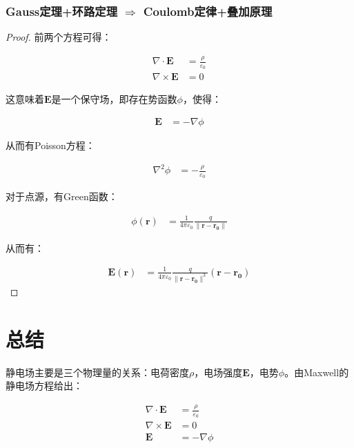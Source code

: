 \documentclass[12pt,onecolumn,a4paper]{book}
\numberwithin{table}{subsection}
\numberwithin{equation}{subsection}
\begin{document}
\subsubsection{Gauss定理+环路定理 $\Rightarrow$ Coulomb定律+叠加原理}

\begin{proof}
    前两个方程可得：

    \begin{align}
        \nabla \cdot \mathbf{E}  & = \frac{\rho}{\varepsilon_0} \\
        \nabla \times \mathbf{E} & = 0
    \end{align}

    这意味着$\mathbf{E}$是一个保守场，即存在势函数$\phi$，使得：

    \begin{align}
        \mathbf{E} & = - \nabla \phi
    \end{align}

    从而有Poisson方程：

    \begin{align}
        \nabla^2 \phi & = - \frac{\rho}{\varepsilon_0}
    \end{align}

    对于点源，有Green函数：

    \begin{align}
        \phi(\mathbf{r}) & = \frac{1}{4 \pi \varepsilon_0} \frac{q}{\|\mathbf{r}-\mathbf{r_0}\|}
    \end{align}

    从而有：

    \begin{align}
        \mathbf{E}(\mathbf{r}) & = \frac{1}{4 \pi \varepsilon_0} \frac{q}{\|\mathbf{r}-\mathbf{r_0}\|^3} (\mathbf{r}-\mathbf{r_0})
    \end{align}

\end{proof}

\section{总结}

静电场主要是三个物理量的关系：电荷密度$\rho$，电场强度$\mathbf{E}$，电势$\phi$。由Maxwell的静电场方程给出：

\begin{align}
    \nabla \cdot \mathbf{E}  & = \frac{\rho}{\varepsilon_0} \\
    \nabla \times \mathbf{E} & = 0                          \\
    \mathbf{E}               & = - \nabla \phi
\end{align}
\end{document}
